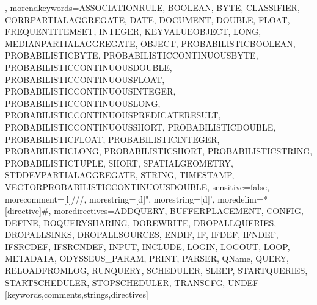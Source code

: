 {{      },%
   morendkeywords={ASSOCIATIONRULE, BOOLEAN, BYTE, CLASSIFIER, CORRPARTIALAGGREGATE, DATE, DOCUMENT, DOUBLE, FLOAT, FREQUENTITEMSET, INTEGER, KEYVALUEOBJECT, LONG, MEDIANPARTIALAGGREGATE, OBJECT, PROBABILISTICBOOLEAN, PROBABILISTICBYTE, PROBABILISTICCONTINUOUSBYTE, PROBABILISTICCONTINUOUSDOUBLE, PROBABILISTICCONTINUOUSFLOAT, PROBABILISTICCONTINUOUSINTEGER, PROBABILISTICCONTINUOUSLONG, PROBABILISTICCONTINUOUSPREDICATERESULT, PROBABILISTICCONTINUOUSSHORT, PROBABILISTICDOUBLE, PROBABILISTICFLOAT, PROBABILISTICINTEGER, PROBABILISTICLONG, PROBABILISTICSHORT, PROBABILISTICSTRING, PROBABILISTICTUPLE, SHORT, SPATIALGEOMETRY, STDDEVPARTIALAGGREGATE, STRING, TIMESTAMP, VECTORPROBABILISTICCONTINUOUSDOUBLE},%
   sensitive=false,
   morecomment=[l]///,%
   morestring=[d]",%
   morestring=[d]',%
   moredelim=*[directive]\#,%
   moredirectives={ADDQUERY, BUFFERPLACEMENT, CONFIG, DEFINE, DOQUERYSHARING, DOREWRITE, DROPALLQUERIES, DROPALLSINKS, DROPALLSOURCES, ENDIF, IF, IFDEF, IFNDEF, IFSRCDEF, IFSRCNDEF, INPUT, INCLUDE, LOGIN, LOGOUT, LOOP, METADATA, ODYSSEUS_PARAM, PRINT, PARSER, QName, QUERY, RELOADFROMLOG, RUNQUERY, SCHEDULER, SLEEP, STARTQUERIES, STARTSCHEDULER, STOPSCHEDULER, TRANSCFG, UNDEF}%
}[keywords,comments,strings,directives]

